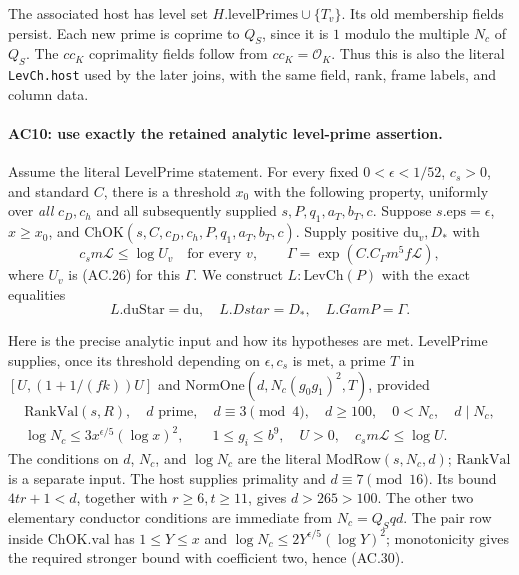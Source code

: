 \documentclass[11pt,a4paper]{article}
\numberwithin{equation}{section}
\theoremstyle{remark}\newtheorem{remark}[theorem]{Remark}
\begin{document}
The associated host has level set
$H.\mathrm{levelPrimes}\cup\{T_v\}$. Its old membership fields persist.
Each new prime is coprime to $Q_S$, since it is $1$ modulo the
multiple $N_c$ of $Q_S$. The $cc_K$ coprimality fields follow from
$cc_K=\mathcal O_K$. Thus this is also the literal
\texttt{LevCh.host} used by the later joins, with the same field,
rank, frame labels, and column data.

\paragraph{AC10: use exactly the retained analytic level-prime assertion.}
Assume the literal $\mathrm{LevelPrime}$ statement. For every fixed
$0<\epsilon<1/52$, $c_s>0$, and standard $C$, there is a threshold
$x_0$ with the following property, uniformly over \emph{all} $c_D,c_h$
and all subsequently supplied $s,P,q_1,a_T,b_T,c$.
Suppose $s.\mathrm{eps}=\epsilon$, $x\geq x_0$, and
$\mathrm{ChOK}(s,C,c_D,c_h,P,q_1,a_T,b_T,c)$.
Supply positive $\mathrm{du}_v,D_*$ with
\[
       c_s m\mathcal L\leq\log U_v\quad\text{for every }v,
       \qquad
       \Gamma=\exp(C.C_\Gamma m^5 f\mathcal L),               \tag{AC.28}
\]
where $U_v$ is (AC.26) for this $\Gamma$.
We construct $L:\mathrm{LevCh}(P)$ with the exact equalities
\[
              L.\mathrm{duStar}=\mathrm{du},\quad
              L.Dstar=D_*,\quad L.GamP=\Gamma.              \tag{AC.29}
\]

Here is the precise analytic input and how its hypotheses are met.
$\mathrm{LevelPrime}$ supplies, once its threshold depending on
$\epsilon,c_s$ is met, a prime $T$ in
$[U,(1+1/(fk))U]$ and
$\mathrm{NormOne}(d,N_c(g_0g_1)^2,T)$, provided
\[
 \begin{gathered}
 \mathrm{RankVal}(s,R),\quad d\text{ prime},\quad d\equiv3\pmod4,
       \quad d\geq100,\quad 0<N_c,\quad d\mid N_c,\\
 \log N_c\leq3x^{\epsilon/5}(\log x)^2,\qquad
 1\leq g_i\leq b^9,\quad U>0,\quad c_s m\mathcal L\leq\log U.
 \end{gathered}                                              \tag{AC.30}
\]
The conditions on $d$, $N_c$, and $\log N_c$ are the literal
$\mathrm{ModRow}(s,N_c,d)$; $\mathrm{RankVal}$ is a separate input.
The host supplies primality and $d\equiv7\pmod {16}$.
Its bound $4tr+1<d$, together with $r\geq6,t\geq11$, gives
$d>265>100$. The other two elementary conductor conditions are
immediate from $N_c=Q_Sqd$. The pair row inside $\mathrm{ChOK.val}$
has $1\leq Y\leq x$ and
$\log N_c\leq2Y^{\epsilon/5}(\log Y)^2$; monotonicity gives
the required stronger bound with coefficient two, hence (AC.30).
\end{document}
